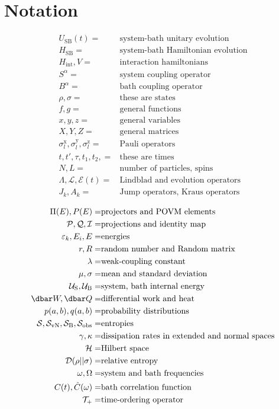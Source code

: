 \chapter*{Notation}
\begin{align*}
    U_\text{SB}(t) =& \text{system-bath unitary evolution} \\
    H_\text{SB} =& \text{system-bath Hamiltonian evolution} \\
    H_\text{int}, V =& \text{interaction hamiltonians} \\
    S^\alpha =& \text{system coupling operator} \\
    B^\alpha =& \text{bath coupling operator} \\
    \rho, \sigma =& \text{these are states} \\
    f,g =& \text{general functions} \\
    x,y,z =& \text{general variables} \\
    X,Y,Z =& \text{general matrices} \\
    \sigma^\text{x}_l,\sigma^\text{y}_l,\sigma^\text{z}_l =& \text{Pauli operators} \\
    t,t',\tau,t_1,t_2, =& \text{these are times} \\
    N,L =& \text{number of particles, spins} \\
    \Lambda, \mathcal{L},\mathcal{E}(t) =& \text{Lindblad and evolution operators} \\
    J_k, A_k =& \text{Jump operators, Kraus operators}
\end{align*}


\begin{align*}
    \Pi(E), P(E) =& \text{projectors and POVM elements} \\
    \mathcal{P,Q,I} =& \text{projections and identity map} \\
    \varepsilon_k, E_i, E =& \text{energies} \\
    r, R =& \text{random number and Random matrix} \\
    \lambda =& \text{weak-coupling constant} \\
    \mu,\sigma =& \text{mean and standard deviation} \\
    \mathcal{U}_\text{S},\mathcal{U}_\text{B} =& \text{system, bath internal energy} \\
    \dbar W, \dbar Q =& \text{differential work and heat} \\
    p(a,b), q(a,b) =& \text{probability distributions} \\
    \mathcal{S},\mathcal{S}_\text{vN}, \mathcal{S}_\text{B}, \mathcal{S}_\text{obs} =& \text{entropies} \\
    \gamma, \kappa =& \text{dissipation rates in extended and normal spaces} \\
    \mathcal{H} =& \text{Hilbert space} \\
    \mathcal{D}(\rho||\sigma) =& \text{relative entropy} \\
    \omega, \Omega  =& \text{system and bath frequencies} \\
    C(t),\hat{C}(\omega) =& \text{bath correlation function} \\
    \mathcal{T}_+ =& \text{time-ordering operator} \\
\end{align*}